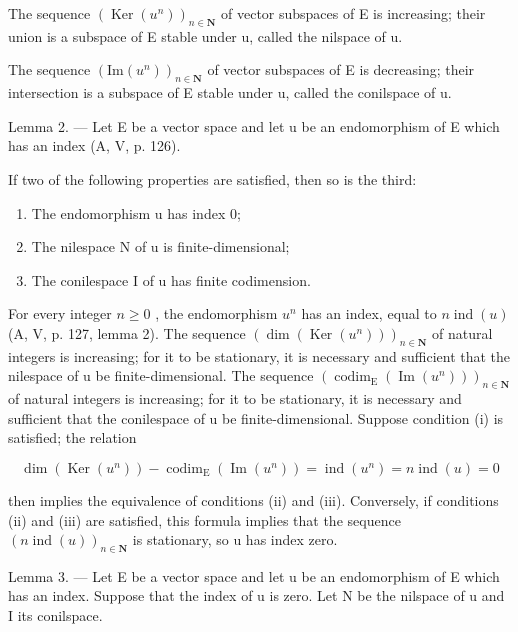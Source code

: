 The sequence \((\operatorname{Ker}(u^{n}))_{n\in\mathbf{N}}\) of vector subspaces of E is increasing; their union is a subspace of E stable under u, called the nilspace of u.

The sequence \((\mathrm{Im}(u^{n}))_{n\in\mathbf{N}}\) of vector subspaces of E is decreasing; their intersection is a subspace of E stable under u, called the conilspace of u.

Lemma 2. --- Let E be a vector space and let u be an endomorphism of E which has an index (A, V, p. 126).

If two of the following properties are satisfied, then so is the third:

\begin{enumerate}
\def\labelenumi{(\roman{enumi})}
\item
  The endomorphism u has index 0;
\item
  The nilespace N of u is finite-dimensional;
\item
  The conilespace I of u has finite codimension.
\end{enumerate}

For every integer \(n \geqslant 0\) , the endomorphism \(u^{n}\) has an index, equal to \(n \operatorname{ind}(u)\) (A, V, p. 127, lemma 2). The sequence \((\dim(\operatorname{Ker}(u^{n})))_{n \in \mathbf{N}}\) of natural integers is increasing; for it to be stationary, it is necessary and sufficient that the nilespace of u be finite-dimensional. The sequence \((\operatorname{codim}_{\operatorname{E}}(\operatorname{Im}(u^{n})))_{n \in \mathbf{N}}\) of natural integers is increasing; for it to be stationary, it is necessary and sufficient that the conilespace of u be finite-dimensional. Suppose condition (i) is satisfied; the relation

\[
\dim (\operatorname{Ker} (u ^ {n})) - \operatorname{codim} _ {\mathrm{E}} (\operatorname{Im} (u ^ {n})) = \operatorname{ind} (u ^ {n}) = n \operatorname{ind} (u) = 0
\]

then implies the equivalence of conditions (ii) and (iii). Conversely, if conditions (ii) and (iii) are satisfied, this formula implies that the sequence \((n\operatorname{ind}(u))_{n\in\mathbf{N}}\) is stationary, so u has index zero.

Lemma 3. --- Let E be a vector space and let u be an endomorphism of E which has an index. Suppose that the index of u is zero. Let N be the nilspace of u and I its conilspace.

